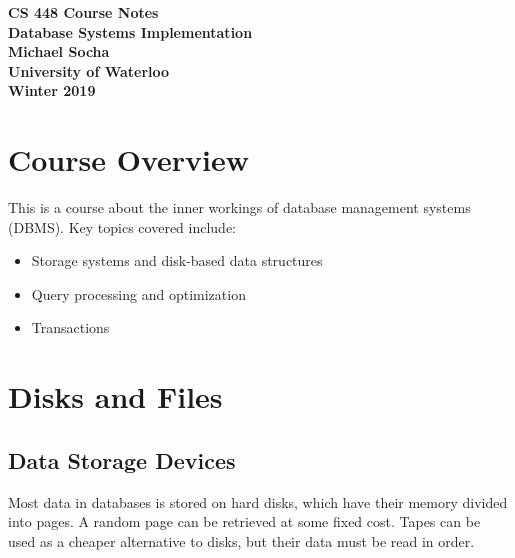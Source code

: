 \documentclass[12pt,titlepage]{article}
\let\stdsection\section
\renewcommand\section{\clearpage\stdsection}
\begin{document}
  \begin{titlepage}
    \vspace*{\fill}
    \centering

    \textbf{\Huge CS 448 Course Notes} \\ [0.4em]
    \textbf{\Large Database Systems Implementation} \\ [1em]
    \textbf{\Large Michael Socha} \\ [1em]
    \textbf{\large University of Waterloo} \\
    \textbf{\large Winter 2019} \\
    \vspace*{\fill}
  \end{titlepage}

  \newpage 


  \tableofcontents

  \newpage


  \section{Course Overview}
    This is a course about the inner workings of database management systems (DBMS). Key topics covered include:
    \begin{itemize}
      \item Storage systems and disk-based data structures
      \item Query processing and optimization
      \item Transactions
    \end{itemize}

  \section{Disks and Files}

    \subsection{Data Storage Devices}
      Most data in databases is stored on hard disks, which have their memory divided into pages. A random page
      can be retrieved at some fixed cost. Tapes can be used as a cheaper alternative to disks, but their data
      must be read in order.
\end{document}
